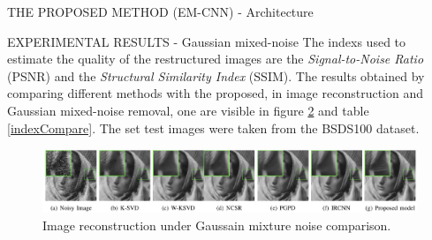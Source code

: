 \begin{frame}{THE PROPOSED METHOD (EM-CNN) - Architecture}
\begin{minipage}{\linewidth}
\begin{minipage}{0.47\linewidth}
\begin{figure}[h!]
                \centering
                \label{fig:EM-CNN}
            \end{figure}
        \end{minipage}
    \end{minipage}
\end{frame}

\begin{frame}{EXPERIMENTAL RESULTS - Gaussian mixed-noise}
    The indexs used to estimate the quality of the restructured images are 
    the \emph{Signal-to-Noise Ratio} (PSNR) and the \emph{Structural Similarity Index} 
    (SSIM). The results obtained by comparing different methods with the 
    proposed, in image reconstruction and Gaussian mixed-noise removal, one 
    are visible in figure \ref{fig:GMNComp} and table \ref{indexCompare}. The set test images were taken from 
    the BSDS100 dataset.
    \begin{figure}[h!]
        \centering
        \includegraphics[width = 0.8\linewidth]{images/paper7/GMN comparison.png}
        \centering
        \caption{Image reconstruction under Gaussain mixture noise comparison.}
        \label{fig:GMNComp}
    \end{figure}
     

\end{frame}
